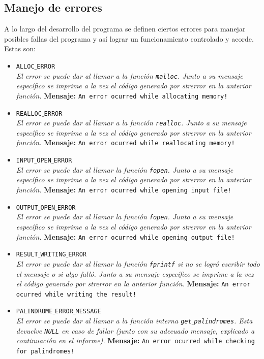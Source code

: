 \documentclass[a4paper, 10pt]{article}
\def\code#1{\texttt{#1}}
\begin{document}
		\subsection{Manejo de errores}
			A lo largo del desarrollo del programa se definen ciertos errores para manejar posibles fallas del
			programa y así lograr un funcionamiento controlado y acorde. Estas son:
			\begin{itemize}

				\item \code{ALLOC$\_$ERROR}
				\\\textit{El error se puede dar al llamar a la función \code{malloc}.
				Junto a su mensaje específico se imprime a la vez el código generado por strerror en
				la anterior función.}
					\subitem \textbf{Mensaje:}
						\subsubitem \code{An error ocurred while allocating memory!}

				\item \code{REALLOC$\_$ERROR}
				\\\textit{El error se puede dar al llamar a la función \code{realloc}.
				Junto a su mensaje específico se imprime a la vez el código generado por strerror en
				la anterior función.}
					\subitem \textbf{Mensaje:}
						\subsubitem \code{An error ocurred while reallocating memory!}

				\item \code{INPUT$\_$OPEN$\_$ERROR}
				\\\textit{El error se puede dar al llamar la función \code{fopen}.
				Junto a su mensaje específico se imprime a la vez el código generado por strerror en
				la anterior función.}
					\subitem \textbf{Mensaje:}
						\subsubitem \code{An error ocurred while opening input file!}

				\item \code{OUTPUT$\_$OPEN$\_$ERROR}
				\\\textit{El error se puede dar al llamar la función \code{fopen}.
				Junto a su mensaje específico se imprime a la vez el código generado por strerror en
				la anterior función.}
					\subitem \textbf{Mensaje:}
						\subsubitem \code{An error ocurred while opening output file!}

				\item \code{RESULT$\_$WRITING$\_$ERROR}
				\\\textit{El error se puede dar al llamar la función \code{fprintf}
				si no se logró escribir todo el mensaje o si algo falló.
				Junto a su mensaje específico se imprime a la vez el código generado por strerror en
				la anterior función.}
					\subitem \textbf{Mensaje:}
						\subsubitem \code{An error ocurred while writing the result!}

				\item \code{PALINDROME$\_$ERROR$\_$MESSAGE}
				\\\textit{El error se puede dar al llamar a la función interna \code{get$\_$palindromes}.
				Esta devuelve \code{NULL} en caso de fallar (junto con su adecuado mensaje, explicado
				a continuación en el informe).}
					\subitem \textbf{Mensaje:}
						\subsubitem \code{An error ocurred while checking for palindromes!}

			\end{itemize}
\end{document}
